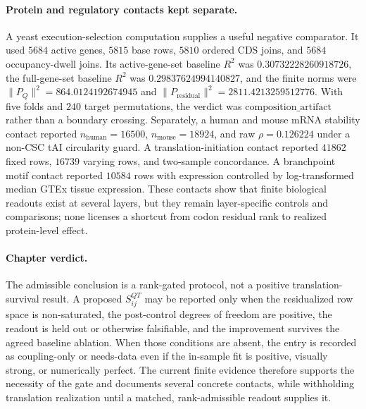 \paragraph{Protein and regulatory contacts kept separate.}
A yeast execution-selection computation supplies a useful negative comparator.  It used $5684$ active genes, $5815$ base rows, $5810$ ordered CDS joins, and $5684$ occupancy-dwell joins.  Its active-gene-set baseline $R^2$ was $0.30732228260918726$, the full-gene-set baseline $R^2$ was $0.29837624994140827$, and the finite norms were $\|P_Q\|^2=864.0124192674945$ and $\|P_{\mathrm{residual}}\|^2=2811.4213259512776$.  With five folds and $240$ target permutations, the verdict was $\mathrm{composition\_artifact}$ rather than a boundary crossing.  Separately, a human and mouse mRNA stability contact reported $n_{\mathrm{human}}=16500$, $n_{\mathrm{mouse}}=18924$, and raw $\rho=0.126224$ under a non-CSC tAI circularity guard.  A translation-initiation contact reported $41862$ fixed rows, $16739$ varying rows, and two-sample concordance.  A branchpoint motif contact reported $10584$ rows with expression controlled by log-transformed median GTEx tissue expression.  These contacts show that finite biological readouts exist at several layers, but they remain layer-specific controls and comparisons; none licenses a shortcut from codon residual rank to realized protein-level effect.

\paragraph{Chapter verdict.}
The admissible conclusion is a rank-gated protocol, not a positive translation-survival result.  A proposed $S^{QT}_{ij}$ may be reported only when the residualized row space is non-saturated, the post-control degrees of freedom are positive, the readout is held out or otherwise falsifiable, and the improvement survives the agreed baseline ablation.  When those conditions are absent, the entry is recorded as coupling-only or needs-data even if the in-sample fit is positive, visually strong, or numerically perfect.  The current finite evidence therefore supports the necessity of the gate and documents several concrete contacts, while withholding translation realization until a matched, rank-admissible readout supplies it.
